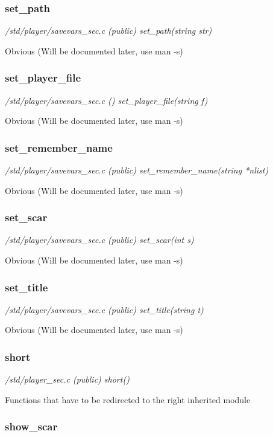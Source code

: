 \subsubsection{set\_path}

{\em /std/player/savevars\_sec.c (public) set\_path(string str)}

Obvious (Will be documented later, use man -s)


\subsubsection{set\_player\_file}

{\em /std/player/savevars\_sec.c () set\_player\_file(string f)}

Obvious (Will be documented later, use man -s)


\subsubsection{set\_remember\_name}

{\em /std/player/savevars\_sec.c (public) set\_remember\_name(string *nlist)}

Obvious (Will be documented later, use man -s)


\subsubsection{set\_scar}

{\em /std/player/savevars\_sec.c (public) set\_scar(int s)}

Obvious (Will be documented later, use man -s)


\subsubsection{set\_title}

{\em /std/player/savevars\_sec.c (public) set\_title(string t)}

Obvious (Will be documented later, use man -s)


\subsubsection{short}

{\em /std/player\_sec.c (public) short()}

Functions that have to be redirected to the right inherited module


\subsubsection{show\_scar}

